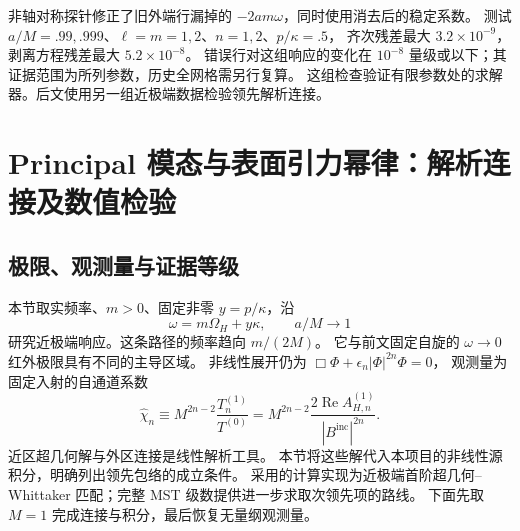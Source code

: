 \documentclass[UTF8,fontset=fandol,11pt,a4paper]{ctexart}
\newcommand{\Rea}{\operatorname{Re}}
\newcommand{\Bin}{B^{\mathrm{inc}}}
\numberwithin{equation}{section}
\begin{document}
非轴对称探针修正了旧外端行漏掉的 $-2am\omega$，同时使用消去后的稳定系数。
测试 $a/M=.99,.999$、$\ell=m=1,2$、$n=1,2$、$p/\kappa=.5$，
齐次残差最大 $3.2\times10^{-9}$，剥离方程残差最大 $5.2\times10^{-8}$。
错误行对这组响应的变化在 $10^{-8}$ 量级或以下；其证据范围为所列参数，历史全网格需另行复算。
这组检查验证有限参数处的求解器。后文使用另一组近极端数据检验领先解析连接。

\section{Principal 模态与表面引力幂律：解析连接及数值检验}
\label{sec:principal-v2}
\subsection{极限、观测量与证据等级}
本节取实频率、$m>0$、固定非零 $y=p/\kappa$，沿
\begin{equation}
\omega=m\Omega_H+y\kappa,\qquad a/M\longrightarrow1
\end{equation}
研究近极端响应。这条路径的频率趋向 $m/(2M)$。
它与前文固定自旋的 $\omega\to0$ 红外极限具有不同的主导区域。
非线性展开仍为 $\Box\Phi+\epsilon_n|\Phi|^{2n}\Phi=0$，
观测量为固定入射的自通道系数
\begin{equation}
\widehat\chi_n\equiv M^{2n-2}\frac{T_n^{(1)}}{T^{(0)}}
=M^{2n-2}\frac{2\Rea A_{H,n}^{(1)}}{|\Bin|^{2n}}.
\label{eq:principal-observable-v2}
\end{equation}
近区超几何解与外区连接是线性解析工具\cite{BredbergKerrCFT2010,MST1996}。
本节将这些解代入本项目的非线性源积分，明确列出领先包络的成立条件。
采用的计算实现为近极端首阶超几何--Whittaker 匹配；完整 MST 级数提供进一步求取次领先项的路线。
下面先取 $M=1$ 完成连接与积分，最后恢复无量纲观测量。
\end{document}
